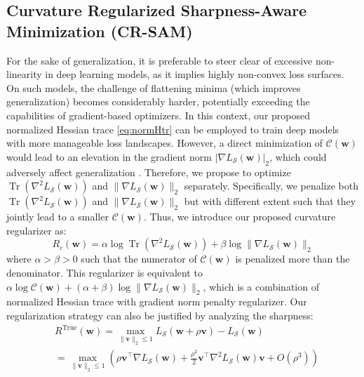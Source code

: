 \documentclass[letterpaper]{article} %
\theoremstyle{plain}
\theoremstyle{definition}
\newcommand{\teal}[1]{\textcolor{teal}{#1}}
\begin{document}
\subsection{Curvature Regularized Sharpness-Aware Minimization (CR-SAM)}
\label{subsec:crsam}
For the sake of generalization, it is preferable to steer clear of excessive non-linearity in deep learning models, as it implies highly non-convex loss surfaces. On such models, the challenge of flattening minima (which improves generalization) becomes considerably harder, potentially exceeding the capabilities of gradient-based optimizers. In this context, our proposed normalized Hessian trace \eqref{eq:normHtr} can be employed to train deep models with more manageable loss landscapes. However, a direct minimization of $\mathcal{C}(\boldsymbol{w})$ would lead to an elevation in the gradient norm $|\nabla L_{\mathcal{S}}(\boldsymbol{w})|_2$, which could adversely affect generalization \cite{zhao2022penalizing}.
Therefore, we propose to optimize $\operatorname{Tr}\left(\nabla^2 L_{\mathcal{S}}\left(\boldsymbol{w}\right)\right)$ and $\|\nabla L_{\mathcal{S}}(\boldsymbol{w})\|_2$ separately. Specifically, we penalize both $\operatorname{Tr}\left(\nabla^2 L_{\mathcal{S}}\left(\boldsymbol{w}\right)\right)$ and $\|\nabla L_{\mathcal{S}}(\boldsymbol{w})\|_2$ but with different extent such that they jointly lead to a smaller $\mathcal{C}(\boldsymbol{w})$. Thus, we introduce our proposed curvature regularizer as:
\begin{equation}
R_c(\boldsymbol{w})= \alpha \log \operatorname{Tr}\left(\nabla^2 L_{\mathcal{S}}\left(\boldsymbol{w}\right)\right) + \beta \log \|\nabla L_{\mathcal{S}}(\boldsymbol{w})\|_2
\end{equation}
where $\alpha > \beta > 0$ such that the numerator of $\mathcal{C}(\boldsymbol{w})$ is penalized more than the denominator. This regularizer is equivalent to $\alpha \log \mathcal{C}(\boldsymbol{w}) + (\alpha+\beta)\log \|\nabla L_{\mathcal{S}}(\boldsymbol{w})\|_2$, which is a combination of normalized Hessian trace with gradient norm penalty regularizer. Our regularization strategy can also be justified by analyzing the sharpness:
\begin{equation*}
\begin{split}
&R^{\mathrm{True}}(\boldsymbol{w})=\max _{\|\boldsymbol{v}\|_2 \leq 1} L_{\mathcal{S}}(\boldsymbol{w}+\rho \boldsymbol{v})-L_{\mathcal{S}}(\boldsymbol{w})\\
&=\max _{\|\boldsymbol{v}\|_2 \leq 1}\left(\rho \boldsymbol{v}^{\top} \nabla L_{\mathcal{S}}(\boldsymbol{w})+\frac{\rho^2}{2} \boldsymbol{v}^{\top} \nabla^2 L_{\mathcal{S}}(\boldsymbol{w}) \boldsymbol{v}+O\left(\rho^3\right)\right)
\end{split}
\end{equation*}
\end{document}
